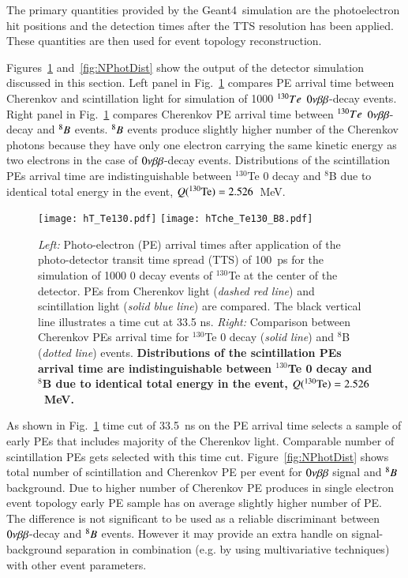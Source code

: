 The primary
quantities provided by the Geant4~simulation are the photoelectron hit
positions and the detection times after the TTS resolution has been
applied. These quantities are then used for event topology reconstruction.

Figures~\ref{fig:ArrivalTimeDist} and~\ref{fig:NPhotDist} show the output of the detector simulation discussed in this section. Left panel in Fig.~\ref{fig:ArrivalTimeDist} compares PE arrival time between Cherenkov and scintillation light for simulation of 1000 $^{130}Te$ $0\nu\beta\beta$-decay events. Right panel in Fig.~\ref{fig:ArrivalTimeDist} compares Cherenkov PE arrival time between $^{130}Te$ $0\nu\beta\beta$-decay and $^{8}B$ events. $^{8}B$ events produce slightly higher number of the Cherenkov photons because they have only one electron carrying the same kinetic energy as two electrons in the case of $0\nu\beta\beta$-decay events. Distributions of the scintillation PEs arrival time are indistinguishable between $^{130}$Te 0{\nbb} decay and $^8$B due to identical total energy in the event, $Q(^{130}{\rm Te})=2.526$~MeV.

\begin{figure*}[ht]
  \centering
  \texttt{[image: hT\_Te130.pdf]}
  \texttt{[image: hTche\_Te130\_B8.pdf]}
  \caption{\emph{Left:} Photo-electron (PE) arrival times after
    application of the photo-detector transit time spread (TTS) of
    100~ps for the simulation of 1000 0{\nbb} decay events of
    $^{130}$Te at the center of the detector. PEs from Cherenkov light
    (\emph{dashed red line}) and scintillation light (\emph{solid blue
      line}) are compared. The black vertical line illustrates a time
    cut at 33.5 ns. \emph{Right:} Comparison between Cherenkov PEs
    arrival time for $^{130}$Te {0\nbb} decay (\emph{solid line}) and
    $^{8}$B (\emph{dotted line}) events. {\bf Distributions of the
      scintillation PEs arrival time are indistinguishable between
      $^{130}$Te 0{\nbb} decay and $^8$B due to identical total energy
      in the event, $Q(^{130}{\rm Te})=2.526$~MeV.} }
\label{fig:ArrivalTimeDist}
\end{figure*}

As shown in Fig.~\ref{fig:ArrivalTimeDist} time cut of 33.5~ns on the PE arrival time selects a sample of early PEs that includes majority of the Cherenkov light. Comparable number of scintillation PEs gets selected with this time cut. Figure~\ref{fig:NPhotDist} shows total number of scintillation and Cherenkov PE per event for $0\nu\beta\beta$ signal and $^{8}B$ background. Due to higher number of Cherenkov PE produces in single electron event topology early PE sample has on average slightly higher number of PE. The difference is not significant to be used as a reliable discriminant between $0\nu\beta\beta$-decay and $^{8}B$ events. However it may provide an extra handle on signal-background separation in combination (e.g. by using multivariative techniques) with other event parameters.


